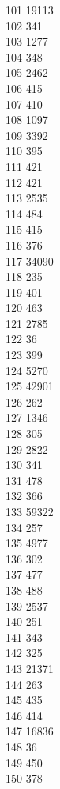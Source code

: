 { 101	19113 \\
 102	341 \\
 103	1277 \\
 104	348 \\
 105	2462 \\
 106	415 \\
 107	410 \\
 108	1097 \\
 109	3392 \\
 110	395 \\
 111	421 \\
 112	421 \\
 113	2535 \\
 114	484 \\
 115	415 \\
 116	376 \\
 117	34090 \\
 118	235 \\
 119	401 \\
 120	463 \\
 121	2785 \\
 122	36 \\
 123	399 \\
 124	5270 \\
 125	42901 \\
 126	262 \\
 127	1346 \\
 128	305 \\
 129	2822 \\
 130	341 \\
 131	478 \\
 132	366 \\
 133	59322 \\
 134	257 \\
 135	4977 \\
 136	302 \\
 137	477 \\
 138	488 \\
 139	2537 \\
 140	251 \\
 141	343 \\
 142	325 \\
 143	21371 \\
 144	263 \\
 145	435 \\
 146	414 \\
 147	16836 \\
 148	36 \\
 149	450 \\
 150	378 \\
}
